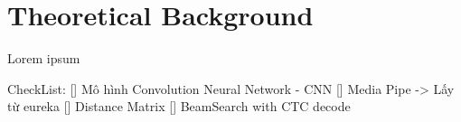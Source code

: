 \chapter{Theoretical Background}

Lorem ipsum

CheckList:
    [] Mô hình Convolution Neural Network - CNN
    [] Media Pipe -> Lấy từ eureka
    [] Distance Matrix
    [] BeamSearch with CTC decode


